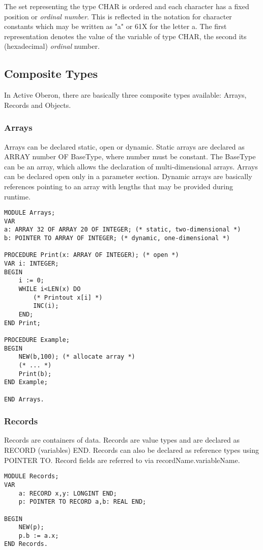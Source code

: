 \documentclass[a4paper,11pt]{article}
\begin{document}
The set representing the type CHAR is ordered and each character has a fixed position or {\em ordinal number}. This is reflected in the notation for character constants which may be written as "a" or 61X for the letter a. The first representation denotes the value of the variable of type CHAR, the second its (hexadecimal) {\em ordinal} number.

\subsection{Composite Types}\label{section:CompositeTypes}

In Active Oberon, there are basically three composite types available: Arrays, Records and Objects.

\subsubsection{Arrays}\label{section:Arrays}
Arrays can be declared static, open or dynamic. Static arrays are declared as ARRAY number OF BaseType, where number must be constant. The BaseType can be an array, which allows the declaration of multi-dimensional arrays. Arrays can be declared open only in a parameter section. Dynamic arrays are basically references pointing to an array with lengths that may be provided during runtime.

\begin{lstlisting}[language=Oberon,frame=none,caption=Using arrays]
MODULE Arrays;
VAR
a: ARRAY 32 OF ARRAY 20 OF INTEGER; (* static, two-dimensional *)
b: POINTER TO ARRAY OF INTEGER; (* dynamic, one-dimensional *)

PROCEDURE Print(x: ARRAY OF INTEGER); (* open *)
VAR i: INTEGER;
BEGIN
    i := 0;
    WHILE i<LEN(x) DO
        (* Printout x[i] *)
        INC(i);
    END;
END Print;

PROCEDURE Example;
BEGIN
    NEW(b,100); (* allocate array *)
    (* ... *)
    Print(b);
END Example;

END Arrays.
\end{lstlisting}

\subsubsection{Records}\label{section:Records}
Records are containers of data. Records are value types and are declared as RECORD (variables) END. Records can also be declared as reference types using POINTER TO. Record fields are referred to via recordName.variableName.
\begin{lstlisting}[language=Oberon,frame=none,caption=Using records]
MODULE Records;
VAR
	a: RECORD x,y: LONGINT END;
	p: POINTER TO RECORD a,b: REAL END;

BEGIN
	NEW(p);
	p.b := a.x;
END Records.
\end{lstlisting}
\end{document}
